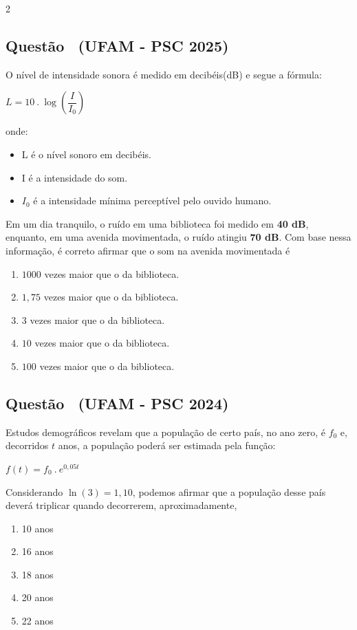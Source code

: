\documentclass[12pt]{article}
\newcommand{\vermelho}[1]{{\color{red}#1}}
\newcounter{questao}
\newcommand{\novaquestao}[1]{%
  \stepcounter{questao}%
  \subsection*{Questão \thequestao\ (#1)}%
}
\begin{document}
    \begin{multicols}{2}
        \columnseprule=0.4pt
        \columnsep=20pt
        \large
        
        \novaquestao{UFAM - PSC 2025} O nível de intensidade sonora é medido em decibéis(dB) e segue a fórmula:
        
        	\begin{center}
        		$L=10 \ . \ \log\left(\dfrac{I}{I_{0}}\right)$    
        	\end{center} onde:
        
        	\begin{itemize}
        		\item L é o nível sonoro em decibéis.
        		\item I é a intensidade do som.
        		\item $I_{0}$ é a intensidade mínima perceptível pelo ouvido humano.
        	\end{itemize} Em um dia tranquilo, o ruído em uma biblioteca foi medido em \textbf{40 dB}, enquanto, em uma avenida movimentada, o ruído atingiu \textbf{70 dB}. Com base nessa informação, é correto afirmar que o som na avenida movimentada é
        
        	\begin{enumerate}[label=(\Alph*), noitemsep]
        		\item \vermelho{$1000$ vezes maior que o da biblioteca.} %
        		\item $1,75$ vezes maior que o da biblioteca.
        		\item $3$ vezes maior que o da biblioteca.
        		\item $10$ vezes maior que o da biblioteca.
        		\item $100$ vezes maior que o da biblioteca.
        	\end{enumerate}
        
        \novaquestao{UFAM - PSC 2024} Estudos demográficos revelam que a população de certo país, no ano zero, é $f_{0}$ e, decorridos $t$ anos, a população poderá ser estimada pela função:
        
        	\begin{center}
        		$f\left( t\right)=f_{0}\ .\ e^{0,05t}$
        	\end{center} Considerando $\ln(3) = 1,10$, podemos afirmar que a população desse país deverá triplicar quando decorrerem, aproximadamente,
        
        	\begin{enumerate}[label=(\Alph*), noitemsep]
        		\item 10 anos
        		\item 16 anos
        		\item 18 anos
        		\item 20 anos
        		\item \vermelho{22 anos} %
        	\end{enumerate}
        	

\end{multicols}
\end{document}
